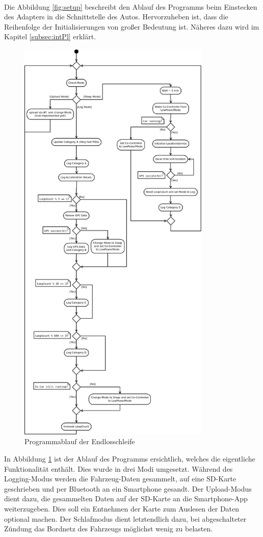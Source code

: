 \paragraph{}
Die Abbildung \ref{fig:setup} beschreibt den Ablauf des Programms beim Einstecken des Adapters in die Schnittstelle des Autos. Hervorzuheben ist, dass die Reihenfolge der Initialisierungen von großer Bedeutung ist. Näheres dazu wird im Kapitel \ref{subsec:intPl} erklärt.
\begin{figure}
  \begin{center}
    \includegraphics[width=\textwidth,height=20cm,keepaspectratio]{./img/ProgLoop}
    \caption{Programmablauf der Endlosschleife}
    \label{fig:loop}
  \end{center}
\end{figure}
In Abbildung \ref{fig:loop} ist der Ablauf des Programms ersichtlich, welches die eigentliche Funktionalität enthält. Dies wurde in drei Modi umgesetzt. Während des Logging-Modus werden die Fahrzeug-Daten gesammelt, auf eine SD-Karte geschrieben und per Bluetooth an ein Smartphone gesandt. Der Upload-Modus dient dazu, die gesammelten Daten auf der SD-Karte an die Smartphone-App weiterzugeben. Dies soll ein Entnehmen der Karte zum Auslesen der Daten optional machen. Der Schlafmodus dient letztendlich dazu, bei abgeschalteter Zündung das Bordnetz des Fahrzeugs möglichst wenig zu belasten.

